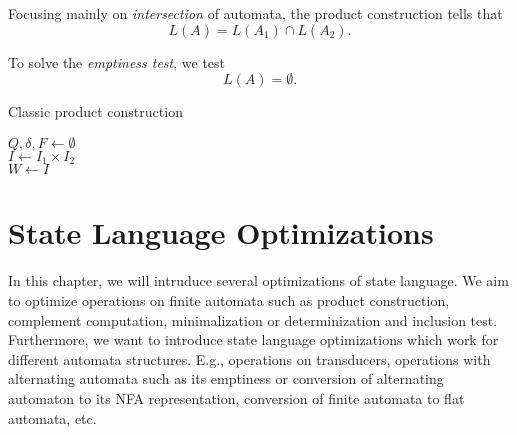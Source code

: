 Focusing mainly on \emph{intersection} of automata, the product construction tells that
$$ L(A) = L(A_1) \cap L(A_2) \text{.} $$

To solve the \emph{emptiness test}, we test
$$ L(A) = \emptyset \text{.}$$

\begin{algorithm}
\caption{Classic product construction}\label{productConstructionAlg}
\DontPrintSemicolon
{}
\BlankLine
$Q, \delta, F \gets \emptyset$ \\
$I \gets I_1 \times I_2$ \\
$W \gets  I$

\end{algorithm}\DecMargin{1em}


\chapter{State Language Optimizations}

In this chapter, we will intruduce several optimizations of state language. We aim to optimize operations on finite automata such as product construction, complement computation, minimalization or determinization and inclusion test. Furthermore, we want to introduce state language optimizations which work for different automata structures. E.g., operations on transducers, operations with alternating automata such as its emptiness or conversion of alternating automaton to its NFA representation, conversion of finite automata to flat automata, etc.

